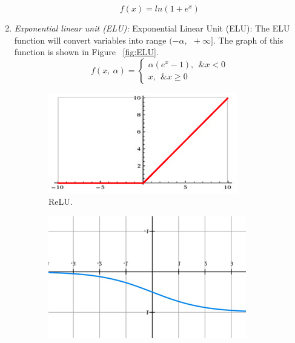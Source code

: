 \documentclass[]{UCD_CS_FYP_Report}
\begin{document}
\begin{enumerate}
\begin{equation}
\label{math:Softplus}
f\left(x\right)=ln\left(1+e^x\right)
\end{equation}
%
\item {\sl Exponential linear unit (ELU):} Exponential Linear Unit (ELU): The ELU function will convert variables into range $(-\alpha{},\ \ +\infty{}]$. The graph of this function is shown in Figure ~\ref{fig:ELU}.
\begin{equation}
\label{math:ELU}
f\left(x,\ \alpha{}\right)=\left\{\begin{array}{l}\alpha{}(e^x-1),\ \ \&x<0 \\
x,\ \ \&x\geq{}0\end{array}\right.
\end{equation}
%
\end{enumerate}
\begin{figure}[h!]
  \centering
  \begin{subfigure}[b]{0.3\linewidth}
    \includegraphics[width=\linewidth]{Images/ReLU.png}
     \caption{\label{fig:ReLU}ReLU.}
  \end{subfigure}
  \begin{subfigure}[b]{0.3\linewidth}
    \includegraphics[width=\linewidth]{Images/Sigmoid.png}

\end{subfigure}
\end{figure}
\end{document}
